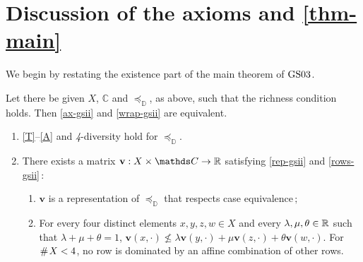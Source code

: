 \documentclass[12pt,a4paper,twoside]{article}
\newcommand{\gsii}{$\textup{GS03}$}
\newcommand{\preceqb}{\mathbin{\preceq}}
\newcommand{\countof}{\mathbin{\#}\hskip1pt}
\newcommand{\mbbd}{{\mathds D}}
\newcommand{\mbbc}{{\mathds C}}
\newcommand{\fourdiv}{\textit{4}-\textup{diversity}}
\begin{document}


\section{Discussion of the axioms and \cref{thm-main}}\label{sec-discussion} We
begin by restating the existence part of the main theorem of \gsii.
\begin{theorem*}[\gsii, existence]\label{thm-gsii}
  Let there be given $X$, $\mbbc$ and $\preceqb_ \mbbd$, as above, such that
  the richness condition holds. Then \ref{ax-gsii} and \ref{wrap-gsii} are
  equivalent.

\begin{enumerate}[label=\textup{(\roman*)}]

\item\label{ax-gsii}

  \textup{\ref{T}--\ref{A}} and \textup{\fourdiv} hold for $\preceq_{\mbbd}$.

\item\label{wrap-gsii} There exists a matrix
  $\mathbf{v} : X \times \mbbc \rightarrow \R$ satisfying \ref{rep-gsii} and \ref{rows-gsii}$\,:$
  \begin{enumerate}[label=\textup{(\alph*)}]
  \item\label{rep-gsii}
  $\mathbf{v}$ is a representation of $\preceq _ {\mbbd}$ that respects case equivalence$\,;$

\item\label{rows-gsii} For every four distinct elements $x,y,z,w \in X$ and
  every $\lambda , \mu, \theta \in \mathbb R$ such that $\lambda +\mu + \theta = 1$,
      $\mathbf{v}(x,\cdot ) \not \leq \lambda \mathbf{v}(y,\cdot )+\mu
      \mathbf{v}(z,\cdot)+ \theta \mathbf{v}(w,\cdot)$.  For $\countof X < 4$,
      no row is dominated by an affine combination of other rows.
\end{enumerate} 

\end{enumerate}
\end{theorem*}
\end{document}
